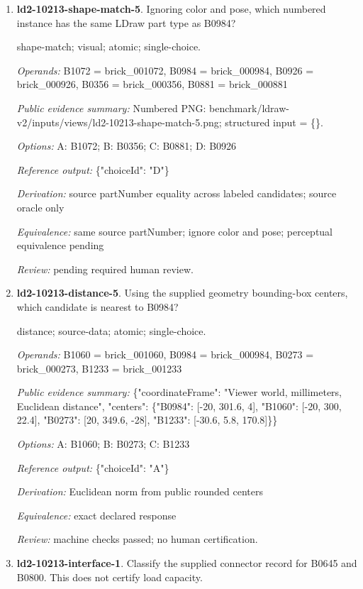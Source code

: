 \begin{enumerate}
\item \textbf{ld2-10213-shape-match-5}. Ignoring color and pose, which numbered instance has the same LDraw part type as B0984?
\par{\small shape-match; visual; atomic; single-choice.\par\textit{Operands:} B1072 = brick\_001072, B0984 = brick\_000984, B0926 = brick\_000926, B0356 = brick\_000356, B0881 = brick\_000881\par\textit{Public evidence summary:} Numbered PNG: benchmark/ldraw-v2/inputs/views/ld2-10213-shape-match-5.png; structured input = \{\}.\par\textit{Options:} A: B1072; B: B0356; C: B0881; D: B0926\par\textit{Reference output:} \{"choiceId": "D"\}\par\textit{Derivation:} source partNumber equality across labeled candidates; source oracle only\par\textit{Equivalence:} same source partNumber; ignore color and pose; perceptual equivalence pending\par\textit{Review:} pending required human review.}
\item \textbf{ld2-10213-distance-5}. Using the supplied geometry bounding-box centers, which candidate is nearest to B0984?
\par{\small distance; source-data; atomic; single-choice.\par\textit{Operands:} B1060 = brick\_001060, B0984 = brick\_000984, B0273 = brick\_000273, B1233 = brick\_001233\par\textit{Public evidence summary:} \{"coordinateFrame": "Viewer world, millimeters, Euclidean distance", "centers": \{"B0984": [-20, 301.6, 4], "B1060": [-20, 300, 22.4], "B0273": [20, 349.6, -28], "B1233": [-30.6, 5.8, 170.8]\}\}\par\textit{Options:} A: B1060; B: B0273; C: B1233\par\textit{Reference output:} \{"choiceId": "A"\}\par\textit{Derivation:} Euclidean norm from public rounded centers\par\textit{Equivalence:} exact declared response\par\textit{Review:} machine checks passed; no human certification.}
\item \textbf{ld2-10213-interface-1}. Classify the supplied connector record for B0645 and B0800. This does not certify load capacity.

\end{enumerate}
